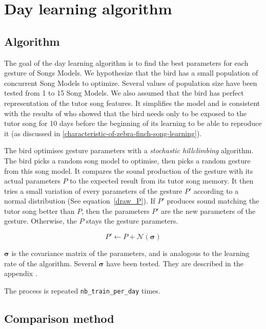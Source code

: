 \documentclass{report}
\begin{document}
\section{Day learning algorithm}\label{day-learning-algorithm}

\subsection{Algorithm}

The goal of the day learning algorithm is to find the best parameters for each
gesture of Songs Models. We hypothesize that the bird has a small population of
concurrent Song Models to optimize. Several values of population size have been
tested from 1 to 15 Song Models. We also assumed that the bird has perfect
representation of the tutor song features. It simplifies the model and is
consistent with the results of \textcite{roper_onset_2006} who showed that the
bird needs only to be exposed to the tutor song for 10 days before the beginning
of its learning to be able to reproduce it (as discussed in
\ref{characteristic-of-zebra-finch-song-learning}).

The bird optimises gesture parameters with a \emph{stochastic hillclimbing}
algorithm. The bird picks a random song model to optimise, then picks a random
gesture from this song model. It compares the sound production of the gesture
with its actual parameters \(P\) to the expected result from its tutor song
memory. It then tries a small variation of every parameters of the gesture
\(P'\) according to a normal distribution (See equation~\ref{draw_P}). If \(P'\)
produces sound matching the tutor song better than \(P\), then the parameters
\(P'\) are the new parameters of the gesture. Otherwise, the \(P\) stays the
gesture parameters.

\begin{equation}
  P' \leftarrow P + \mathcal{N}(\pmb \sigma) \label{draw_P}
\end{equation}

\(\pmb \sigma\) is the covariance matrix of the parameters, and is analogous to
the learning rate of the algorithm. Several \(\pmb \sigma\) have been tested. They are described in the appendix \todo{}.

The process is repeated \texttt{nb\_train\_per\_day} times.


\subsection{Comparison method}
\end{document}
